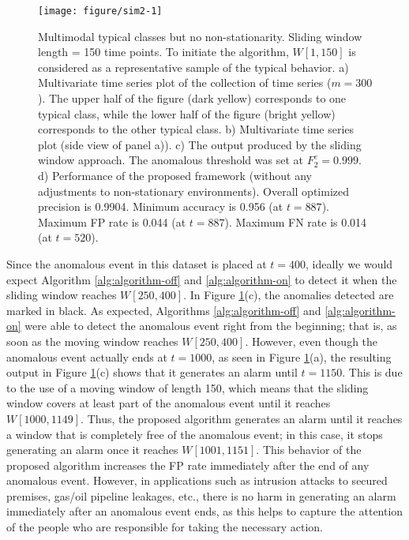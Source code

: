 \documentclass[12pt]{article}
\begin{document}
\begin{figure}[ht]

{\centering \texttt{[image: figure/sim2-1]} 

}

\caption{Multimodal typical classes but no non-stationarity. Sliding window length = 150 time points. To initiate the algorithm, $W[1,150]$ is considered as a representative sample of the typical behavior. a) Multivariate time series plot of the collection of time series ($m = 300$). The upper half of the figure (dark yellow) corresponds to one typical class, while the lower half of the figure (bright yellow) corresponds to the other typical class. b) Multivariate time series plot (side view of panel a)). c) The output produced by the sliding window approach. The anomalous threshold was set at $F_{2}^{e} = 0.999.$  d) Performance of the proposed framework (without any adjustments to non-stationary environments). Overall optimized precision is 0.9904. Minimum accuracy is 0.956 (at $t = 887$). Maximum FP rate is 0.044 (at $t=887$). Maximum FN rate is 0.014 (at $t=520$).}\label{fig:sim2}
\end{figure}

Since the anomalous event in this dataset is placed at \(t = 400\),
ideally we would expect Algorithm \ref{alg:algorithm-off} and
\ref{alg:algorithm-on} to detect it when the sliding window reaches
\(W[250, 400]\). In Figure \ref{fig:sim2}(c), the anomalies detected are
marked in black. As expected, Algorithms \ref{alg:algorithm-off} and
\ref{alg:algorithm-on} were able to detect the anomalous event right
from the beginning; that is, as soon as the moving window reaches
\(W[250, 400]\). However, even though the anomalous event actually ends
at \(t = 1000\), as seen in Figure \ref{fig:sim2}(a), the resulting
output in Figure \ref{fig:sim2}(c) shows that it generates an alarm
until \(t = 1150\). This is due to the use of a moving window of length
150, which means that the sliding window covers at least part of the
anomalous event until it reaches \(W[1000, 1149]\). Thus, the proposed
algorithm generates an alarm until it reaches a window that is
completely free of the anomalous event; in this case, it stops
generating an alarm once it reaches \(W[1001, 1151]\). This behavior of
the proposed algorithm increases the FP rate immediately after the end
of any anomalous event. However, in applications such as intrusion
attacks to secured premises, gas/oil pipeline leakages, etc., there is
no harm in generating an alarm immediately after an anomalous event
ends, as this helps to capture the attention of the people who are
responsible for taking the necessary action.
\end{document}
